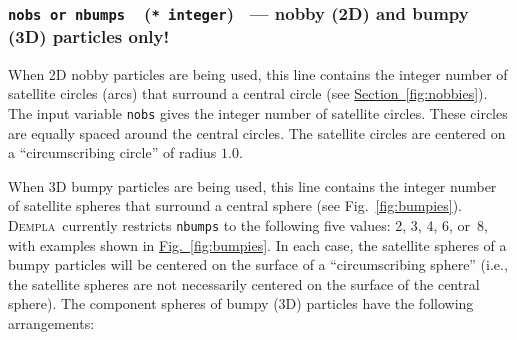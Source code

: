 \documentclass[letterpaper,11pt]{article}
\newcommand{\Dempla}{\textsc{Dempla}}
\newcommand{\Var}[2]{\texttt{#1}\ \  (\texttt{#2})}
\begin{document}
\subsubsection[\texttt{nobs} or \texttt{nbumps}]
              {\Var{nobs \textrm{or} nbumps}{* integer}%
              \ --- nobby (2D) and bumpy (3D)
              particles only!}\label{sec:nobs}
When 2D nobby particles are being used, this line contains the
integer number of satellite circles (arcs) that surround a central circle
(see \hyperref[fig:nobbies]{Section~\ref*{fig:nobbies}}).
The input variable \texttt{nobs} gives the integer number of
satellite circles.  These circles are equally spaced around the
central circles.
The satellite circles are centered on a ``circumscribing circle''
of radius $1.0$.
\par
When 3D bumpy particles are being used, this line contains the
integer number of satellite spheres that surround a central sphere
(see Fig.~\ref{fig:bumpies}).
\Dempla\ currently restricts \texttt{nbumps} to the following five values:
2, 3, 4, 6, or~8, with examples shown in
\hyperref[fig:bumpies]{Fig.~\ref*{fig:bumpies}}.
In each case, the satellite spheres of a bumpy particles will be centered
on the surface of a ``circumscribing sphere'' (i.e., the
satellite spheres are not necessarily centered on the surface of the
central sphere).
The component spheres of bumpy (3D) particles have the following
arrangements:
%
\end{document}
